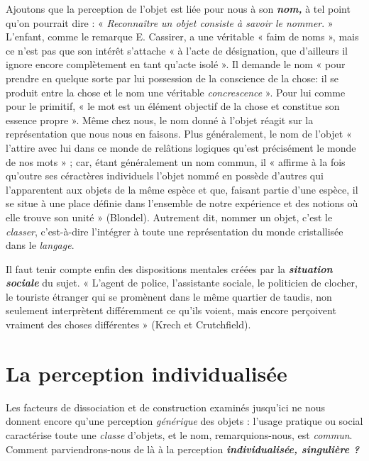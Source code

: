 Ajoutons que la perception de l’objet est liée pour nous à son
\textbf{\textit {nom,}} à tel point qu’on pourrait dire : « {\it Reconnaître un objet consiste à
savoir le nommer}. » L'enfant, comme le remarque E. Cassirer, a
une véritable « faim de noms », mais ce n’est pas que son intérêt
s'attache « à l’acte de désignation, que d’ailleurs il ignore encore
complètement en tant qu’acte isolé ». Il demande le nom « pour prendre
en quelque sorte par lui possession de la conscience de la chose: il se
produit entre la chose et le nom une véritable {\it concrescence} ». Pour lui
comme pour le primitif, « le mot est un élément objectif de la chose
et constitue son essence propre ». Même chez nous, le nom donné à
l’objet réagit sur la représentation que nous nous en faisons. Plus
généralement, le nom de l’objet « l’attire avec lui dans ce monde de
relâtions logiques qu’est précisément le monde de nos mots » ; car,
étant généralement un nom commun, il « affirme à la fois qu’outre
ses céractères individuels l’objet nommé en possède d’autres qui
l’apparentent aux objets de la même espèce et que, faisant partie
d’une espèce, il se situe à une place définie dans l’ensemble de notre
expérience et des notions où elle trouve son unité » (Blondel).
Autrement dit, nommer un objet, c’est le {\it classer}, c’est-à-dire l'intégrer
à toute une représentation du monde cristallisée dans le {\it langage}.

Il faut tenir compte enfin des dispositions mentales créées par la
\textbf{\textit {situation sociale}} du sujet. « L'agent de police, l’assistante sociale, le
politicien de clocher, le touriste étranger qui se promènent dans le
même quartier de taudis, non seulement interprètent différemment
ce qu’ils voient, mais encore perçoivent vraiment des choses différentes »
(Krech et Crutchfield).

\section{La perception individualisée}%
Les facteurs de dissociation
et de construction examinés jusqu'ici ne nous donnent encore
qu’une perception {\it générique} des objets : l’usage pratique ou social
caractérise toute une {\it classe} d'objets, et le nom, remarquions-nous,
est {\it commun}. Comment parviendrons-nous de là à la perception \textbf{\textit {individualisée,
singulière ?}}

